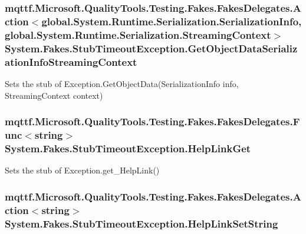 \hypertarget{class_system_1_1_fakes_1_1_stub_timeout_exception_aca304abf1616376b4a3a9c4aa2890f96}{
\subsubsection[{Get\-Object\-Data\-Serialization\-Info\-Streaming\-Context}]{\setlength{\rightskip}{0pt plus 5cm}mqttf.\-Microsoft.\-Quality\-Tools.\-Testing.\-Fakes.\-Fakes\-Delegates.\-Action$<$global.\-System.\-Runtime.\-Serialization.\-Serialization\-Info, global.\-System.\-Runtime.\-Serialization.\-Streaming\-Context$>$ System.\-Fakes.\-Stub\-Timeout\-Exception.\-Get\-Object\-Data\-Serialization\-Info\-Streaming\-Context}}\label{class_system_1_1_fakes_1_1_stub_timeout_exception_aca304abf1616376b4a3a9c4aa2890f96}


Sets the stub of Exception.\-Get\-Object\-Data(\-Serialization\-Info info, Streaming\-Context context)

\hypertarget{class_system_1_1_fakes_1_1_stub_timeout_exception_a2499308ae65c0f93af83d86ed495f209}{
\subsubsection[{Help\-Link\-Get}]{\setlength{\rightskip}{0pt plus 5cm}mqttf.\-Microsoft.\-Quality\-Tools.\-Testing.\-Fakes.\-Fakes\-Delegates.\-Func$<$string$>$ System.\-Fakes.\-Stub\-Timeout\-Exception.\-Help\-Link\-Get}}\label{class_system_1_1_fakes_1_1_stub_timeout_exception_a2499308ae65c0f93af83d86ed495f209}


Sets the stub of Exception.\-get\-\_\-\-Help\-Link()

\hypertarget{class_system_1_1_fakes_1_1_stub_timeout_exception_a3559b48cc1e1b0c3a56eb01f876f1177}{
\subsubsection[{Help\-Link\-Set\-String}]{\setlength{\rightskip}{0pt plus 5cm}mqttf.\-Microsoft.\-Quality\-Tools.\-Testing.\-Fakes.\-Fakes\-Delegates.\-Action$<$string$>$ System.\-Fakes.\-Stub\-Timeout\-Exception.\-Help\-Link\-Set\-String}}\label{class_system_1_1_fakes_1_1_stub_timeout_exception_a3559b48cc1e1b0c3a56eb01f876f1177}


